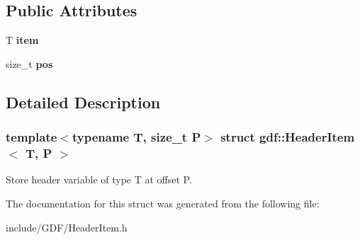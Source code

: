 \subsection*{Public Attributes}
\begin{DoxyCompactItemize}
\item 
\hypertarget{structgdf_1_1_header_item_a9b7e1442ba79f8d4fb64955b397ce79f}{
T {\bfseries item}}
\label{structgdf_1_1_header_item_a9b7e1442ba79f8d4fb64955b397ce79f}

\item 
\hypertarget{structgdf_1_1_header_item_ad92b903a032ea69589c789a52dd19021}{
size\_\-t {\bfseries pos}}
\label{structgdf_1_1_header_item_ad92b903a032ea69589c789a52dd19021}

\end{DoxyCompactItemize}


\subsection{Detailed Description}
\subsubsection*{template$<$typename T, size\_\-t P$>$ struct gdf::HeaderItem$<$ T, P $>$}

Store header variable of type T at offset P. 

The documentation for this struct was generated from the following file:\begin{DoxyCompactItemize}
\item 
include/GDF/HeaderItem.h\end{DoxyCompactItemize}
